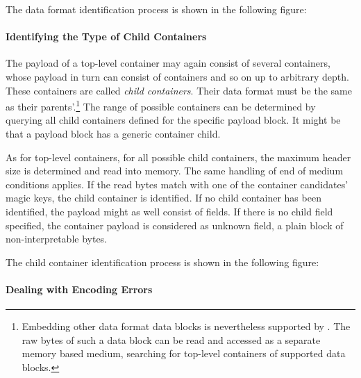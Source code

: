 The data format identification process is shown in the following figure:



\paragraph{Identifying the Type of Child Containers}
\label{sec:IdentifyingTheDataFormatOfContainers}

The payload of a top-level container may again consist of several containers, whose payload in turn can consist of containers and so on up to arbitrary depth. These containers are called \emph{child containers}. Their data format must be the same as their parents'.\footnote{Embedding other data format data blocks is nevertheless supported by \LibName{}. The raw bytes of such a data block can be read and accessed as a separate memory based medium, searching for top-level containers of supported data blocks.} The range of possible containers can be determined by querying all child containers defined for the specific payload block. It might be that a payload block has a generic container child.

As for top-level containers, for all possible child containers, the maximum header size is determined and read into memory. The same handling of end of medium conditions applies. If the read bytes match with one of the container candidates' magic keys, the child container is identified. If no child container has been identified, the payload might as well consist of fields. If there is no child field specified, the container payload is considered as unknown field, a plain block of non-interpretable bytes.

The child container identification process is shown in the following figure:



\paragraph{Dealing with Encoding Errors}
\label{sec:DealingwithEncodingErrors}

